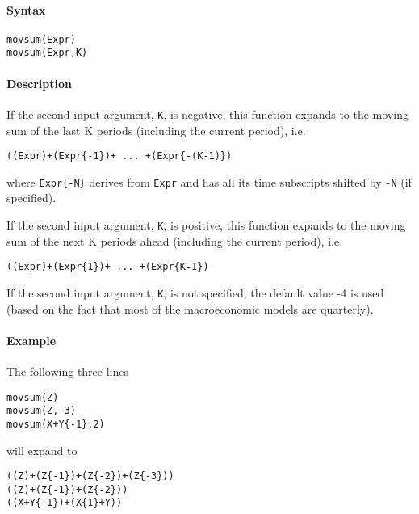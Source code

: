 


	\paragraph{Syntax}

\begin{verbatim}
movsum(Expr)
movsum(Expr,K)
\end{verbatim}

\paragraph{Description}

If the second input argument, \texttt{K}, is negative, this function
expands to the moving sum of the last K periods (including the current
period), i.e.

\begin{verbatim}
((Expr)+(Expr{-1})+ ... +(Expr{-(K-1)})
\end{verbatim}

where \texttt{Expr\{-N\}} derives from \texttt{Expr} and has all its
time subscripts shifted by \texttt{-N} (if specified).

If the second input argument, \texttt{K}, is positive, this function
expands to the moving sum of the next K periods ahead (including the
current period), i.e.

\begin{verbatim}
((Expr)+(Expr{1})+ ... +(Expr{K-1})
\end{verbatim}

If the second input argument, \texttt{K}, is not specified, the default
value -4 is used (based on the fact that most of the macroeconomic
models are quarterly).

\paragraph{Example}

The following three lines

\begin{verbatim}
movsum(Z)
movsum(Z,-3)
movsum(X+Y{-1},2)
\end{verbatim}

will expand to

\begin{verbatim}
((Z)+(Z{-1})+(Z{-2})+(Z{-3}))
((Z)+(Z{-1})+(Z{-2}))
((X+Y{-1})+(X{1}+Y))
\end{verbatim}


